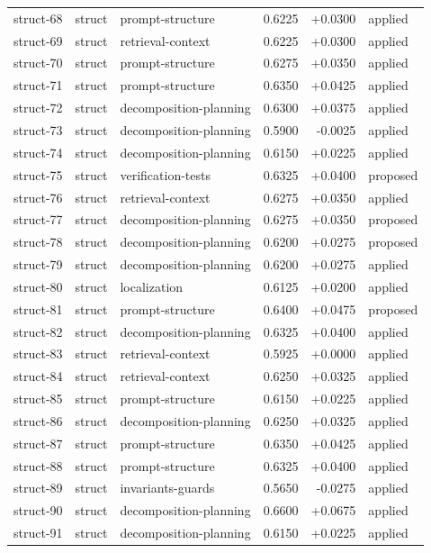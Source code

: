 \begin{center}
\begin{longtable}{llp{5.2cm}rrl}
struct-68 & struct & prompt-structure & 0.6225 & +0.0300 & applied \\
struct-69 & struct & retrieval-context & 0.6225 & +0.0300 & applied \\
struct-70 & struct & prompt-structure & 0.6275 & +0.0350 & applied \\
struct-71 & struct & prompt-structure & 0.6350 & +0.0425 & applied \\
struct-72 & struct & decomposition-planning & 0.6300 & +0.0375 & applied \\
struct-73 & struct & decomposition-planning & 0.5900 & -0.0025 & applied \\
struct-74 & struct & decomposition-planning & 0.6150 & +0.0225 & applied \\
struct-75 & struct & verification-tests & 0.6325 & +0.0400 & proposed \\
struct-76 & struct & retrieval-context & 0.6275 & +0.0350 & applied \\
struct-77 & struct & decomposition-planning & 0.6275 & +0.0350 & proposed \\
struct-78 & struct & decomposition-planning & 0.6200 & +0.0275 & proposed \\
struct-79 & struct & decomposition-planning & 0.6200 & +0.0275 & applied \\
struct-80 & struct & localization & 0.6125 & +0.0200 & applied \\
struct-81 & struct & prompt-structure & 0.6400 & +0.0475 & proposed \\
struct-82 & struct & decomposition-planning & 0.6325 & +0.0400 & applied \\
struct-83 & struct & retrieval-context & 0.5925 & +0.0000 & applied \\
struct-84 & struct & retrieval-context & 0.6250 & +0.0325 & applied \\
struct-85 & struct & prompt-structure & 0.6150 & +0.0225 & applied \\
struct-86 & struct & decomposition-planning & 0.6250 & +0.0325 & applied \\
struct-87 & struct & prompt-structure & 0.6350 & +0.0425 & applied \\
struct-88 & struct & prompt-structure & 0.6325 & +0.0400 & applied \\
struct-89 & struct & invariants-guards & 0.5650 & -0.0275 & applied \\
struct-90 & struct & decomposition-planning & 0.6600 & +0.0675 & applied \\
struct-91 & struct & decomposition-planning & 0.6150 & +0.0225 & applied \\

\end{longtable}
\end{center}

